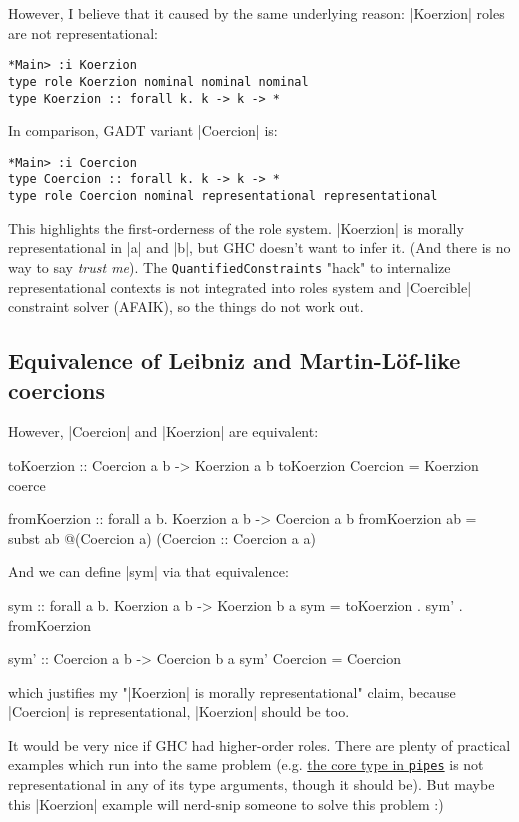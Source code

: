 However, I believe that it caused by the same underlying reason:
|Koerzion| roles are not representational:

\begin{verbatim}
*Main> :i Koerzion 
type role Koerzion nominal nominal nominal
type Koerzion :: forall k. k -> k -> *
\end{verbatim}

In comparison, GADT variant |Coercion| is:

\begin{verbatim}
*Main> :i Coercion
type Coercion :: forall k. k -> k -> *
type role Coercion nominal representational representational
\end{verbatim}

This highlights the first-orderness of the role system.
|Koerzion| is morally representational in |a| and |b|, but GHC
doesn't want to infer it. (And there is no way to say \emph{trust me}).
The \texttt{QuantifiedConstraints} "hack" to internalize
representational contexts is not integrated into roles system and 
|Coercible| constraint solver (AFAIK), so the things do not work out.

\subsection{Equivalence of Leibniz and Martin-Löf-like coercions}

However, |Coercion| and |Koerzion| are equivalent:

\begin{code}
toKoerzion :: Coercion a b -> Koerzion a b
toKoerzion Coercion = Koerzion coerce

fromKoerzion :: forall a b. Koerzion a b -> Coercion a b
fromKoerzion ab = subst ab @(Coercion a) (Coercion :: Coercion a a)
\end{code}

And we can define |sym| via that equivalence:

\begin{code}
sym :: forall a b. Koerzion a b -> Koerzion b a
sym = toKoerzion . sym' . fromKoerzion

sym' :: Coercion a b -> Coercion b a
sym' Coercion = Coercion
\end{code}

which justifies my "|Koerzion| is morally representational" claim,
because |Coercion| is representational, |Koerzion| should be too.

It would be very nice if GHC had higher-order roles.
There are plenty of practical examples which run into the same
problem (e.g. \href{https://hackage.haskell.org/package/pipes-4.3.16/docs/Pipes-Core.html#t:Proxy}{the core type in \texttt{pipes}} is not representational in any of its type arguments, though it should be).
But maybe this |Koerzion| example will nerd-snip someone to solve this problem :)
